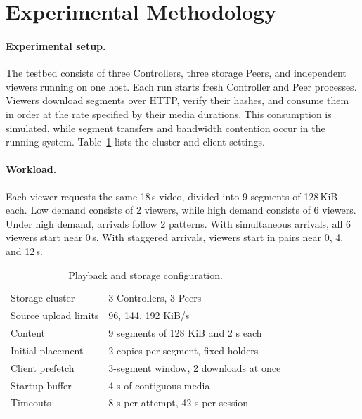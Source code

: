 \section{Experimental Methodology}
\label{sec:method}

\paragraph{Experimental setup.}
The testbed consists of three Controllers, three storage Peers, and
independent viewers running on one host. Each run starts fresh Controller
and Peer processes. Viewers download segments over HTTP, verify their
hashes, and consume them in order at the rate specified by their media
durations. This consumption is simulated, while segment transfers and
bandwidth contention occur in the running system.
Table~\ref{tab:fixture} lists the cluster and client settings.

\paragraph{Workload.}
Each viewer requests the same 18\,s video, divided into 9 segments of 128\,KiB each.
Low demand consists of 2 viewers, while high demand consists of 6 viewers. 
Under high demand, arrivals follow 2 patterns.
With simultaneous arrivals, all 6 viewers start near 0\,s. 
With staggered arrivals, viewers start in pairs near 0, 4, and 12\,s. 

\begin{table}[ht]
\centering\small
\caption{Playback and storage configuration.}
\label{tab:fixture}
\begin{tabular}{@{}ll@{}}
\toprule
Storage cluster & 3 Controllers, 3 Peers \\
Source upload limits & 96, 144, 192 KiB/s \\
Content & 9 segments of 128 KiB and 2 s each \\
Initial placement & 2 copies per segment, fixed holders \\
Client prefetch & 3-segment window, 2 downloads at once \\
Startup buffer & 4 s of contiguous media \\
Timeouts & 8 s per attempt, 42 s per session \\
\bottomrule
\end{tabular}
\end{table}

